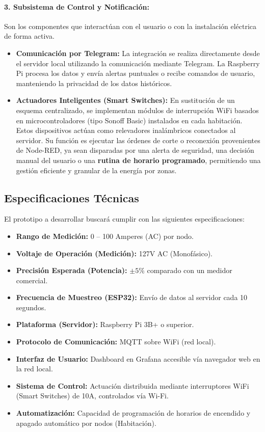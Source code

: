         \paragraph{3. Subsistema de Control y Notificación:}
        Son los componentes que interactúan con el usuario o con la instalación eléctrica de forma activa.
        \begin{itemize}
            \item \textbf{Comunicación por Telegram:} La integración se realiza directamente desde el servidor local utilizando la comunicación mediante Telegram. La Raspberry Pi procesa los datos y envía alertas puntuales o recibe comandos de usuario, manteniendo la privacidad de los datos históricos.
            
            \item \textbf{Actuadores Inteligentes (Smart Switches):}
            En sustitución de un esquema centralizado, se implementan módulos de interrupción WiFi basados en microcontroladores (tipo Sonoff Basic) instalados en cada habitación. Estos dispositivos actúan como relevadores inalámbricos conectados al servidor. Su función es ejecutar las órdenes de corte o reconexión provenientes de Node-RED, ya sean disparadas por una alerta de seguridad, una decisión manual del usuario o una \textbf{rutina de horario programado}, permitiendo una gestión eficiente y granular de la energía por zonas.
        \end{itemize}

    \subsection{Especificaciones Técnicas}
        El prototipo a desarrollar buscará cumplir con las siguientes especificaciones:
        \begin{itemize}
            \item \textbf{Rango de Medición:} 0 – 100 Amperes (AC) por nodo.
            \item \textbf{Voltaje de Operación (Medición):} 127V AC (Monofásico).
            \item \textbf{Precisión Esperada (Potencia):} $\pm 5\%$ comparado con un medidor comercial.
            \item \textbf{Frecuencia de Muestreo (ESP32):} Envío de datos al servidor cada 10 segundos.
            \item \textbf{Plataforma (Servidor):} Raspberry Pi 3B+ o superior.
            \item \textbf{Protocolo de Comunicación:} MQTT sobre WiFi (red local).
            \item \textbf{Interfaz de Usuario:} Dashboard en Grafana accesible vía navegador web en la red local.
            \item \textbf{Sistema de Control:} Actuación distribuida mediante interruptores WiFi (Smart Switches) de 10A, controlados vía Wi-Fi.
            \item \textbf{Automatización:} Capacidad de programación de horarios de encendido y apagado automático por nodos (Habitación).
        \end{itemize}
\newpage
